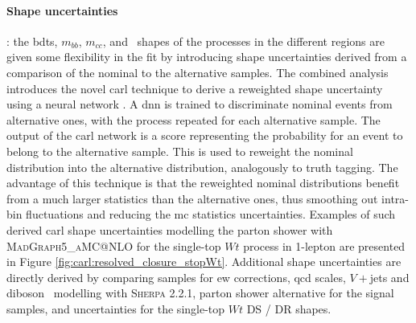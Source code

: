 \paragraph{Shape uncertainties}: the \glspl{bdt}, $m_{bb}$, $m_{cc}$, and \ptv\ shapes of the processes in the different regions are given some flexibility in the fit by introducing shape uncertainties derived from a comparison of the nominal to the alternative samples. The combined analysis introduces the novel \gls{carl} technique to derive a reweighted shape uncertainty using a neural network \cite{carl}. A \gls{dnn} is trained to discriminate nominal events from alternative ones, with the process repeated for each alternative sample. The output of the \gls{carl} network is a score representing the probability for an event to belong to the alternative sample. This is used to reweight the nominal distribution into the alternative distribution, analogously to truth tagging. The advantage of this technique is that the reweighted nominal distributions benefit from a much larger statistics than the alternative ones, thus smoothing out intra-bin fluctuations and reducing the \gls{mc} statistics uncertainties. Examples of such derived \gls{carl} shape uncertainties modelling the parton shower with \textsc{MadGraph5\_aMC@NLO} for the single-top $Wt$ process in 1-lepton are presented in Figure \ref{fig:carl:resolved_closure_stopWt}. Additional shape uncertainties are directly derived by comparing samples for \gls{ew} corrections, \gls{qcd} scales, $V+$jets and diboson \ptv\ modelling with \textsc{Sherpa} 2.2.1, parton shower alternative for the signal samples, and uncertainties for the single-top $Wt$ DS / DR shapes.

